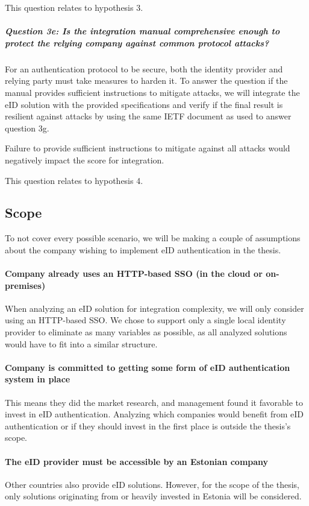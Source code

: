 This question relates to hypothesis 3.

\subparagraph{Question 3e: Is the integration manual comprehensive enough to protect the relying company against common protocol attacks?}\noindent

For an authentication protocol to be secure, both the identity provider and relying party must take measures to harden it. To answer the question if the manual provides sufficient instructions to mitigate attacks, we will integrate the eID solution with the provided specifications and verify if the final result is resilient against attacks by using the same IETF document as used to answer question 3g.

Failure to provide sufficient instructions to mitigate against all attacks would negatively impact the score for integration.

This question relates to hypothesis 4.

\subsection{Scope}

To not cover every possible scenario, we will be making a couple of assumptions about the company wishing to implement eID authentication in the thesis.

\paragraph{Company already uses an HTTP-based SSO (in the cloud or on-premises)} When analyzing an eID solution for integration complexity, we will only consider using an HTTP-based SSO. We chose to support only a single local identity provider to eliminate as many variables as possible, as all analyzed solutions would have to fit into a similar structure.

\paragraph{Company is committed to getting some form of eID authentication system in place} This means they did the market research, and management found it favorable to invest in eID authentication. Analyzing which companies would benefit from eID authentication or if they should invest in the first place is outside the thesis's scope.

\paragraph{The eID provider must be accessible by an Estonian company} Other countries also provide eID solutions. However, for the scope of the thesis, only solutions originating from or heavily invested in Estonia will be considered.

